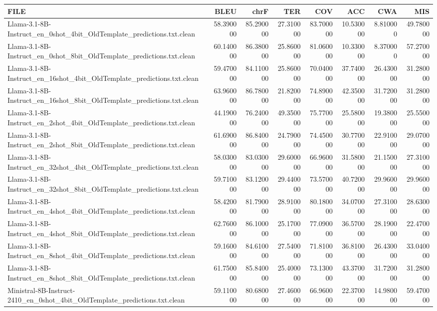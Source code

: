 \begin{tabular}{lrrrrrrr}
\toprule
FILE & BLEU & chrF & TER & COV & ACC & CWA & MIS \\
\midrule
Llama-3.1-8B-Instruct_en_0shot_4bit_OldTemplate_predictions.txt.clean & 58.390000 & 85.290000 & 27.310000 & 83.700000 & 10.530000 & 8.810000 & 49.780000 \\
Llama-3.1-8B-Instruct_en_0shot_8bit_OldTemplate_predictions.txt.clean & 60.140000 & 86.380000 & 25.860000 & 81.060000 & 10.330000 & 8.370000 & 57.270000 \\
Llama-3.1-8B-Instruct_en_16shot_4bit_OldTemplate_predictions.txt.clean & 59.470000 & 84.110000 & 25.860000 & 70.040000 & 37.740000 & 26.430000 & 31.280000 \\
Llama-3.1-8B-Instruct_en_16shot_8bit_OldTemplate_predictions.txt.clean & 63.960000 & 86.780000 & 21.820000 & 74.890000 & 42.350000 & 31.720000 & 31.280000 \\
Llama-3.1-8B-Instruct_en_2shot_4bit_OldTemplate_predictions.txt.clean & 44.190000 & 76.240000 & 49.350000 & 75.770000 & 25.580000 & 19.380000 & 25.550000 \\
Llama-3.1-8B-Instruct_en_2shot_8bit_OldTemplate_predictions.txt.clean & 61.690000 & 86.840000 & 24.790000 & 74.450000 & 30.770000 & 22.910000 & 29.070000 \\
Llama-3.1-8B-Instruct_en_32shot_4bit_OldTemplate_predictions.txt.clean & 58.030000 & 83.030000 & 29.600000 & 66.960000 & 31.580000 & 21.150000 & 27.310000 \\
Llama-3.1-8B-Instruct_en_32shot_8bit_OldTemplate_predictions.txt.clean & 59.710000 & 83.120000 & 29.440000 & 73.570000 & 40.720000 & 29.960000 & 29.960000 \\
Llama-3.1-8B-Instruct_en_4shot_4bit_OldTemplate_predictions.txt.clean & 58.420000 & 81.790000 & 28.910000 & 80.180000 & 34.070000 & 27.310000 & 28.630000 \\
Llama-3.1-8B-Instruct_en_4shot_8bit_OldTemplate_predictions.txt.clean & 62.760000 & 86.100000 & 25.170000 & 77.090000 & 36.570000 & 28.190000 & 22.470000 \\
Llama-3.1-8B-Instruct_en_8shot_4bit_OldTemplate_predictions.txt.clean & 59.160000 & 84.610000 & 27.540000 & 71.810000 & 36.810000 & 26.430000 & 33.040000 \\
Llama-3.1-8B-Instruct_en_8shot_8bit_OldTemplate_predictions.txt.clean & 61.750000 & 85.840000 & 25.400000 & 73.130000 & 43.370000 & 31.720000 & 31.280000 \\
Ministral-8B-Instruct-2410_en_0shot_4bit_OldTemplate_predictions.txt.clean & 59.110000 & 80.680000 & 27.460000 & 66.960000 & 22.370000 & 14.980000 & 59.470000 \\

\end{tabular}
